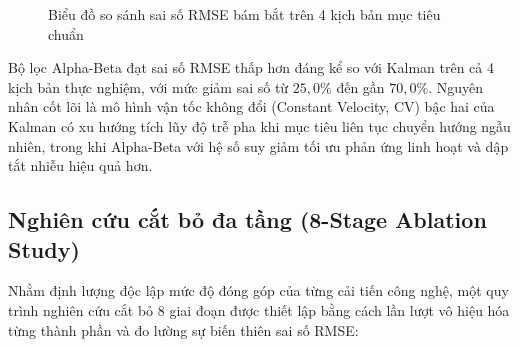 \begin{figure}[H]
\centering
{}
\caption{Biểu đồ so sánh sai số RMSE bám bắt trên 4 kịch bản mục tiêu chuẩn}
\label{fig:filter-bar}
\end{figure}

Bộ lọc Alpha-Beta đạt sai số RMSE thấp hơn đáng kể so với Kalman trên cả 4 kịch bản thực nghiệm, với mức giảm sai số từ $25{,}0\%$ đến gần $70{,}0\%$. Nguyên nhân cốt lõi là mô hình vận tốc không đổi (Constant Velocity, CV) bậc hai của Kalman có xu hướng tích lũy độ trễ pha khi mục tiêu liên tục chuyển hướng ngẫu nhiên, trong khi Alpha-Beta với hệ số suy giảm tối ưu phản ứng linh hoạt và dập tắt nhiễu hiệu quả hơn.

\subsection{Nghiên cứu cắt bỏ đa tầng (8-Stage Ablation Study)}

\hspace{0.5cm} Nhằm định lượng độc lập mức độ đóng góp của từng cải tiến công nghệ, một quy trình nghiên cứu cắt bỏ 8 giai đoạn được thiết lập bằng cách lần lượt vô hiệu hóa từng thành phần và đo lường sự biến thiên sai số RMSE:

